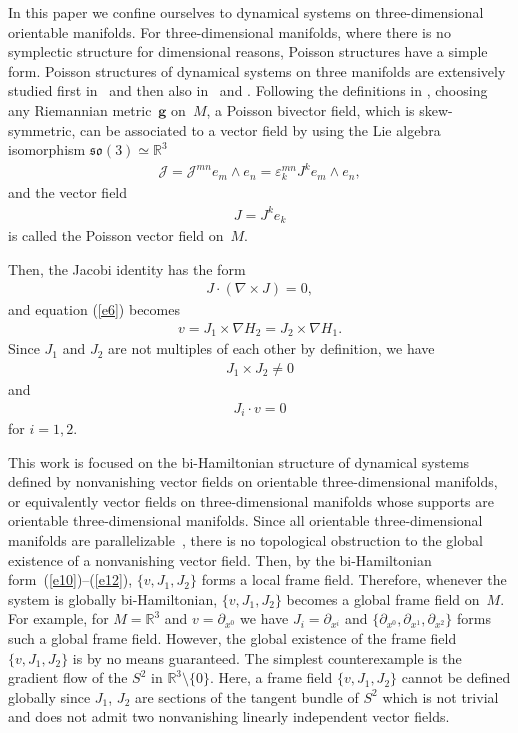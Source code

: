\documentclass[pdftex]{sigma}
\numberwithin{equation}{section}
\begin{document}
In this paper we conf\/ine ourselves to dynamical systems on three-dimensional orientable manifolds. For three-dimensional manifolds, where there is no symplectic structure for dimensional reasons, Poisson structures have a simple form. Poisson structures of dynamical systems on three manifolds are extensively studied f\/irst in~\cite{Nutku} and then also in~\cite{Haas} and \cite{Gengoux}. Following the def\/initions in \cite{Nutku}, choosing any Riemannian metric~$\boldsymbol{g}$ on~$M$, a Poisson bivector f\/ield, which is skew-symmetric, can be associated to a vector f\/ield by using the Lie algebra isomorphism $\mathfrak{so}(3) \simeq \mathbb{R}^{3}$
\begin{gather*}
\mathcal{J}=\mathcal{J}^{mn}e_{m}\wedge e_{n}=\varepsilon _{k}^{mn}J^{k}e_{m}\wedge e_{n},
\end{gather*}
and the vector f\/ield
\begin{gather*}
J=J^{k}e_{k}
\end{gather*}
is called the Poisson vector f\/ield on~$M$.

Then, the Jacobi identity has the form
\begin{gather}
J\cdot ( \nabla \times J) =0, \label{e9}
\end{gather}
and equation (\ref{e6}) becomes
\begin{gather}
v=J_{1}\times \nabla H_{2}=J_{2}\times \nabla H_{1}. \label{e10}
\end{gather}
Since $J_{1}$ and $J_{2}$ are not multiples of each other by def\/inition, we have
\begin{gather}
J_{1}\times J_{2}\neq 0 \label{e11}
\end{gather}
and
\begin{gather}
J_{i}\cdot v=0 \label{e12}
\end{gather}
for $i=1,2$.

This work is focused on the bi-Hamiltonian structure of dynamical systems def\/ined by non\-va\-nishing vector f\/ields on orientable three-dimensional manifolds, or equivalently vector f\/ields on three-dimensional manifolds whose supports are orientable three-dimensional manifolds. Since all orientable three-dimensional manifolds are parallelizable~\cite{Steifel}, there is no topological obstruction to the global existence of a nonvanishing vector f\/ield. Then, by the bi-Hamiltonian form~(\ref{e10})--(\ref{e12}), $\{ v,J_{1},J_{2}\} $ forms a local frame f\/ield. Therefore, whenever the system is globally bi-Hamiltonian, $\{v,J_{1},J_{2}\} $ becomes a global frame f\/ield on~$M$. For example, for $M=\mathbb{R}^{3}$ and $v=\partial _{x^{0}}$ we have $J_{i}=\partial _{x^{i}}$ and $\{ \partial _{x^{0}},\partial _{x^{1}},\partial _{x^{2}}\} $ forms such a global frame f\/ield. However, the global existence of the frame f\/ield $\{ v,J_{1},J_{2}\} $ is by no means guaranteed. The simplest counterexample is the gradient f\/low of the $S^{2}$ in $\mathbb{R}^{3}\setminus \{0\} $. Here, a frame f\/ield $\{ v,J_{1},J_{2}\}$ cannot be def\/ined globally since $J_{1}$, $J_{2}$ are sections of the tangent bundle of $S^{2}$ which is not trivial and does not admit two nonvanishing linearly independent vector f\/ields.
\end{document}
